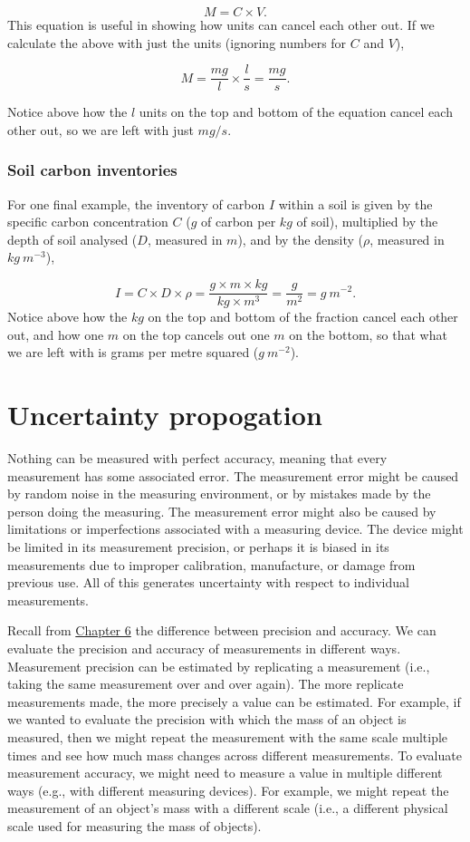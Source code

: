 \documentclass[
]{scrbook}
\begin{document}
\[M = C \times V.\]
This equation is useful in showing how units can cancel each other out.
If we calculate the above with just the units (ignoring numbers for \(C\) and \(V\)),

\[M = \frac{mg}{l} \times \frac{l}{s} = \frac{mg}{s}.\]

Notice above how the \(l\) units on the top and bottom of the equation cancel each other out, so we are left with just \(mg/s\).

\hypertarget{soil-carbon-inventories}{%
\subsection{Soil carbon inventories}\label{soil-carbon-inventories}}

For one final example, the inventory of carbon \(I\) within a soil is given by the specific carbon concentration \(C\) (\(g\) of carbon per \(kg\) of soil), multiplied by the depth of soil analysed (\(D\), measured in \(m\)), and by the density (\(\rho\), measured in \(kg\:m^{-3}\)),

\[I = C \times D \times \rho = \frac{g\times m \times kg}{kg \times m^{3}} = \frac{g}{m^{2}} = g\:m^{-2}.\]
Notice above how the \(kg\) on the top and bottom of the fraction cancel each other out, and how one \(m\) on the top cancels out one \(m\) on the bottom, so that what we are left with is grams per metre squared (\(g\:m^{-2}\)).

\hypertarget{Chapter_7}{%
\chapter{Uncertainty propogation}\label{Chapter_7}}

Nothing can be measured with perfect accuracy, meaning that every measurement has some associated error.
The measurement error might be caused by random noise in the measuring environment, or by mistakes made by the person doing the measuring.
The measurement error might also be caused by limitations or imperfections associated with a measuring device.
The device might be limited in its measurement precision, or perhaps it is biased in its measurements due to improper calibration, manufacture, or damage from previous use.
All of this generates uncertainty with respect to individual measurements.

Recall from \protect\hyperlink{Chapter_6}{Chapter 6} the difference between precision and accuracy.
We can evaluate the precision and accuracy of measurements in different ways.
Measurement precision can be estimated by replicating a measurement (i.e., taking the same measurement over and over again).
The more replicate measurements made, the more precisely a value can be estimated.
For example, if we wanted to evaluate the precision with which the mass of an object is measured, then we might repeat the measurement with the same scale multiple times and see how much mass changes across different measurements.
To evaluate measurement accuracy, we might need to measure a value in multiple different ways (e.g., with different measuring devices).
For example, we might repeat the measurement of an object's mass with a different scale (i.e., a different physical scale used for measuring the mass of objects).
\end{document}
